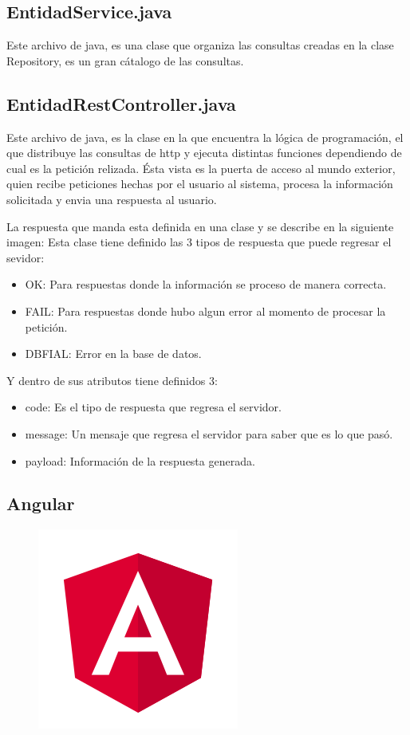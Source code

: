 \subsection{EntidadService.java}
Este archivo de java, es una clase que organiza las consultas creadas en la clase Repository, es un gran cátalogo de las consultas.
\subsection{EntidadRestController.java}
Este archivo de java, es la clase en la que encuentra la lógica de programación, el que distribuye las consultas de http y ejecuta distintas funciones dependiendo de cual es la petición relizada.
Ésta vista es la puerta de acceso al mundo exterior, quien recibe peticiones hechas por el usuario al sistema, procesa la información solicitada y envia una respuesta al usuario.

La respuesta que manda esta definida en una clase y se describe en la siguiente imagen:
Esta clase tiene definido las 3 tipos de respuesta que puede regresar el sevidor:
\begin{itemize}
    \item OK: Para respuestas donde la información se proceso de manera correcta.
    \item FAIL: Para respuestas donde hubo algun error al momento de procesar la petición.
    \item DBFIAL: Error en la base de datos.
\end{itemize}
Y dentro de sus atributos tiene definidos 3:
\begin{itemize}
    \item code: Es el tipo de respuesta que regresa el servidor.
    \item message: Un mensaje que regresa el servidor para saber que es lo que pasó.
    \item payload: Información de la respuesta generada.
\end{itemize}

\subsection{Angular}



\begin{figure}[H]
    \centering
    \includegraphics[width=0.4\linewidth]{images/tecnologias/angular.png}
\end{figure}